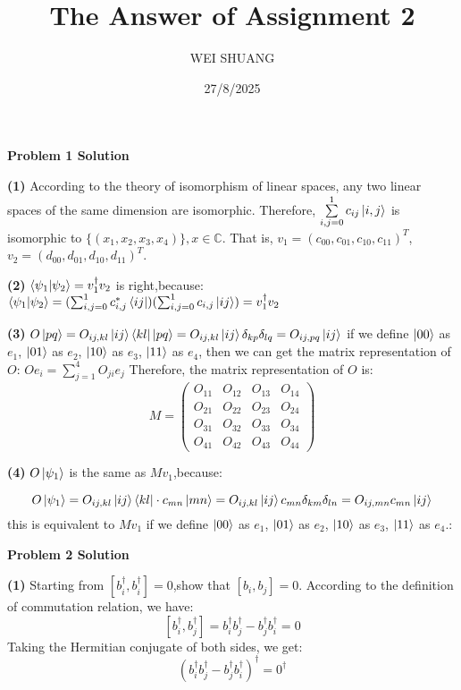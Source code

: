 \documentclass[12pt]{article}
\title{The Answer of Assignment 2}
\author{WEI SHUANG}
\date{27/8/2025}
\begin{document}
\maketitle

\begin{center}
    \textbf{Problem 1 Solution}
\end{center}

\textbf{(1)}
According to the theory of isomorphism of linear spaces, any two linear spaces of the same dimension are isomorphic. Therefore, $\sum\limits_{i,j=0}^{1}c_{ij}\ket{i,j}$ is isomorphic to $\{(x_1,x_2,x_3,x_4)\}, x\in \mathbb{C}$. That is, $v_1=(c_{00},c_{01},c_{10},c_{11})^T$, $v_2=(d_{00},d_{01},d_{10},d_{11})^T$.




\textbf{(2)}
$\braket{\psi_1|\psi_2}=v_1^\dagger v_2$ is right,because:
$\braket{\psi_1|\psi_2}=(\sum_{i,j=0}^1c_{i,j}^*\bra{ij})(\sum_{i,j=0}^{1}c_{i,j}\ket{ij})=v_1^\dagger v_2$

\textbf{(3)}
$O\ket{pq}=O_{ij,kl}\ket{ij}\bra{kl}\ket{pq}=O_{ij,kl}\ket{ij}\delta_{kp}\delta_{lq}=O_{ij,pq}\ket{ij}$ 
if we define $\ket{00}$ as $e_1$, $\ket{01}$ as $e_2$, $\ket{10}$ as $e_3$, $\ket{11}$ as $e_4$, then we can get the matrix representation of $O$:
$Oe_i=\sum_{j=1}^4O_{ji}e_j$
Therefore, the matrix representation of $O$ is:
\[M=\begin{pmatrix}
O_{11} & O_{12} & O_{13} & O_{14} \\
O_{21} & O_{22} & O_{23} & O_{24} \\
O_{31} & O_{32} & O_{33} & O_{34} \\
O_{41} & O_{42} & O_{43} & O_{44}    
\end{pmatrix}\]

\textbf{(4)}
$O\ket{\psi_1}$ is the same as $Mv_1$,because:

\[
O\ket{\psi_1}=O_{ij,kl}\ket{ij}\bra{kl}\cdot c_{mn}\ket{mn}=O_{ij,kl}\ket{ij}c_{mn}\delta_{km}\delta_{ln}=O_{ij,mn}c_{mn}\ket{ij}
\]
this is equivalent to $Mv_1$ if we define $\ket{00}$ as $e_1$, $\ket{01}$ as $e_2$, $\ket{10}$ as $e_3$, $\ket{11}$ as $e_4$.:

\begin{center}
    \textbf{Problem 2 Solution}
\end{center}

\textbf{(1)}
Starting from $[b_i^\dagger,b_i^\dagger]=0$,show that $[b_i,b_j]=0$.
According to the definition of commutation relation, we have:
\[[b_i^\dagger,b_j^\dagger]=b_i^\dagger b_j^\dagger - b_j^\dagger b_i^\dagger=0\]
Taking the Hermitian conjugate of both sides, we get:
\[(b_i^\dagger b_j^\dagger - b_j^\dagger b_i^\dagger)^\dagger = 0^\dagger\]
\end{document}
